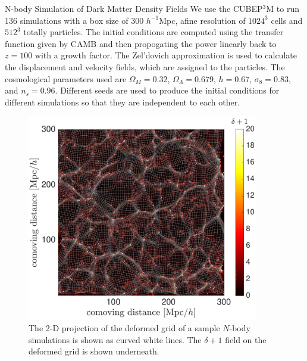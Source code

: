 \begin{section}{N-body Simulation of Dark Matter Density Fields}
  \label{sec:simulation}
    We use the \textsc{CUBEP$^3$M} \cite{bib:Harnois2013} to 
run 136 simulations with a box size of 300 $h^{-1}$Mpc, 
afine resolution of $1024^3$ cells and $512^3$ totally particles. The initial conditions are 
computed using the transfer function given by CAMB \cite{bib:Lewis2000} 
and then propogating the power linearly back to $z=100$ with a growth factor. The Zel'dovich approximation 
is used to calculate the displacement and velocity fields, which are 
assigned to the particles. The cosmological parameters used are $\Omega_M=0.32$, 
$\Omega_{\Lambda}=0.679$, $h=0.67$, $\sigma_8=0.83$, and $n_s=0.96$. Different seeds are used to produce 
the initial conditions for different simulations so that they are 
independent to each other.
\begin{figure}[t!]
\centering
 \includegraphics[width=0.9\textwidth]{sar_bbest_analysis-crop.pdf}
   \caption{
The 2-D projection of the 
deformed grid of a sample $N$-body simulations is shown as curved white lines. The $\delta+1$ field 
on the deformed grid is shown underneath.}
 \label{fig:simandrec}
\end{figure}

\end{section}

